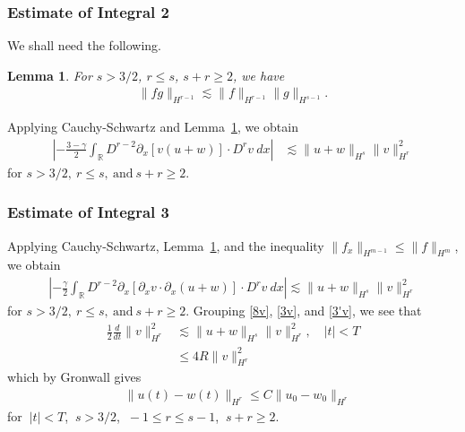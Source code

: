 \documentclass[12pt,reqno]{amsart}
\numberwithin{equation}{section}  %
\numberwithin{figure}{section}
\newcommand{\rr}{\mathbb{R}}
\newcommand{\p}{\partial}
\newtheorem{lemma}{Lemma}
\begin{document}
\subsubsection{Estimate of Integral 2} We shall need the following.
%
%
%
%
%
%
%
%
\begin{lemma}
For $s > 3/2$, $r \le s$, $s + r \ge 2$, we have
%
%
\begin{equation*}
\begin{split}
  \| fg \|_{H^{r-1}} \lesssim \| f \|_{H^{r-1}} \| g \|_{H^{s-1}}.
\end{split}
\end{equation*}
%
%
\label{lem:frac-deriv}
\end{lemma}
%
%
Applying Cauchy-Schwartz and Lemma~\ref{lem:frac-deriv}, we obtain
%
%
%
\begin{equation}
\begin{split}
\left | - \frac{3-\gamma}{2} \int_{\rr}  D^{r -2}
\p_x[v(u+w)] \cdot
D^r v \ dx  \right |
 & \lesssim \|u+w\|_{H^{s}} \|v\|_{H^r}^2
 \label{3v}
\end{split}
\end{equation}
%
for $s > 3/2, \ r \le s, \ \text{and} \ s + r \ge 2$.
%
%
\subsubsection{Estimate of Integral 3} Applying
Cauchy-Schwartz, Lemma~\ref{lem:frac-deriv}, and the inequality $\| f_{x}
\|_{H^{m-1}} \le \| f \|_{H^{m}}$, we obtain
%
%
%
\begin{equation}
\begin{split}
\left | - \frac{\gamma}{2} \int_{\rr} D^{r 
-2} \p_x [ \p_x v
\cdot \p_x (u+w)]\cdot D^r v \ dx \right | 
 \lesssim \|u+w \|_{H^{s}}
\|v\|_{H^r}^2
\label{3'v}
\end{split}
\end{equation}
%
%
for $s > 3/2, \ r \le s, \ \text{and} \ s + r \ge 2$.
%
%
%
%
Grouping \eqref{8v}, \eqref{3v}, and \eqref{3'v}, we see that
%
%
\begin{equation}
\begin{split}
\frac{1}{2} \frac{d}{dt}
\|v\|_{H^r}^2
& \lesssim \|u+w\|_{H^s}
\|v\|_{H^r}^2, \quad | t | < T
\\
& \le 4R \| v \|_{H^{r}}^{2}
\label{9v}
\end{split}
\end{equation}
%
%
%
%
%
which by Gronwall gives
%
%
\begin{equation}
  \label{lip-ineq}
\begin{split}
  & \| u(t) - w(t) \|_{H^{r}} \le C \| u_{0} - w_{0} \|_{H^{r}} 
  \end{split}
\end{equation}
%
%
for $\ | t | < T$, $\ s > 3/2$, $\ -1 \le r \le s-1$, $\ s + r \ge 2$.
%
%
%
%
%
%
%
%
%
\end{document}
